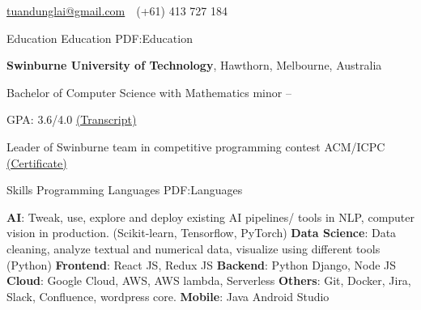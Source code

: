 \documentclass[letterpaper,MMMyyyy,nonstopmode]{simpleresumecv}
\newcommand{\CVAuthor}{Tuan Dung Lai}
\newcommand{\CVWebpage}{dunglai.github.io}
\begin{document}

\Title{\CVAuthor}

\begin{SubTitle}
\par
\href{mailto:tuandunglai@gmail.com}
{tuandunglai@gmail.com}
\,\SubBulletSymbol\,
(+61) 413 727 184
\,
\end{SubTitle}

\begin{Body}


\Section
{Education}
{Education}
{PDF:Education}

\Entry
{\textbf{Swinburne University of Technology}},
Hawthorn, Melbourne, Australia

\Gap
\BulletItem
Bachelor of Computer Science with Mathematics minor
\hfill
{} --

\SubBulletItem GPA: 3.6/4.0 
\href{https://dunglai.github.io/public/post-assets/About/AcademicTranscript.pdf}{(\color{blue}Transcript)}

\SubBulletItem Leader of Swinburne team in competitive programming contest ACM/ICPC \href{https://dunglai.github.io/public/post-assets/About/CVLatex/ACMcert.png}{(\color{blue}Certificate)}

\Section 
{Skills}
{Programming Languages}
{PDF:Languages}

\BulletItem \textbf{AI}: Tweak, use, explore and deploy existing AI pipelines/ tools in NLP, computer vision in production. (Scikit-learn, Tensorflow, PyTorch)
\BulletItem \textbf{Data Science}: Data cleaning, analyze textual and numerical data, visualize using different tools (Python)
\BulletItem \textbf{Frontend}: React JS, Redux JS
\BulletItem \textbf{Backend}: Python Django, Node JS
\BulletItem \textbf{Cloud}: Google Cloud, AWS, AWS lambda, Serverless
\BulletItem \textbf{Others}: Git, Docker, Jira, Slack, Confluence, wordpress core.
\BulletItem \textbf{Mobile}: Java Android Studio





\end{Body}
\end{document}
